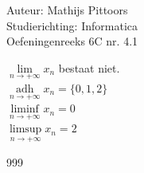 \documentclass[a4paper]{article}
\newcommand{\llim}{\lim\limits}
\newcommand{\adh}{\underset{n\rightarrow+\infty}{\operatorname{adh}}}
\begin{document}
\noindent \large Auteur: Mathijs Pittoors \\
\noindent \large Studierichting: Informatica\\
\noindent \large Oefeningenreeks 6C nr. 4.1\\

\medskip

\normalsize

$\llim_{n \rightarrow + \infty} x_n$ bestaat niet.\\

$\adh x_n = \{0,1,2\}$\\

$\liminf\limits_{n\rightarrow+\infty} x_n = 0$\\

$\limsup\limits_{n\rightarrow+\infty} x_n = 2$\\


\begin{thebibliography}{999}
\end{thebibliography}
\end{document}
